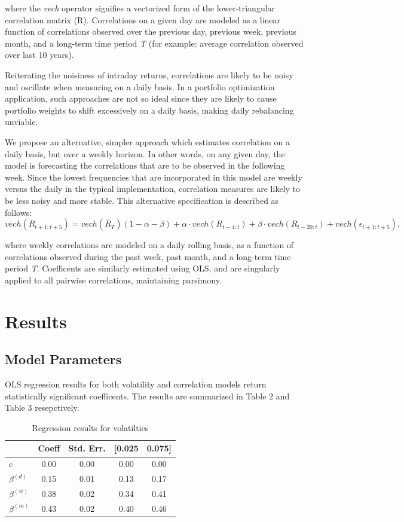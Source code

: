\documentclass{article}
\begin{document}
where the \textit{vech} operator signifies a vectorized form of the lower-triangular
correlation matrix (R). Correlations on a given day are modeled as a linear
function of correlations observed over the previous day, previous week, previous month,
and a long-term time period \textit{T} (for example: average correlation observed over last 10 years).

Reiterating the noisiness of intraday returns, correlations are likely to be noisy and 
oscillate when measuring on a daily basis. In a portfolio optimization application, such
approaches are not so ideal since they are likely to cause portfolio weights to 
shift excessively on a daily basis, making daily rebalancing unviable.

We propose an alternative, simpler approach which estimates correlation on a daily basis, but over
a weekly horizon. In other words, on any given day, the model is forecasting the correlations
that are to be observed in the following week. Since the lowest frequencies that are incorporated
in this model are weekly versus the daily in the typical implementation, correlation measures are 
likely to be less noisy and more stable. This alternative specification is described as follows:
$$vech(R_{t+1:t+5}) = vech(\bar{R}_T)(1 - \alpha - \beta) + \alpha\cdot vech(R_{t-4:t}) + \beta\cdot vech(R_{t-20:t}) + vech(\epsilon_{t+1:t+5}),$$

where weekly correlations are modeled on a daily rolling basis, as a function of correlations observed
during the past week, past month, and a long-term time period \textit{T}. Coefficents are similarly estimated using OLS,
and are singularly applied to all pairwise correlations, maintaining parsimony.

\section{Results}
\subsection{Model Parameters}

OLS regression results for both volatility and correlation models
return statistically significant coefficents. The results are summarized in
Table 2 and Table 3 resepctively.

\begin{table}[ht]
    \centering
    \caption{Regression results for volatilties}
    \begin{tabular}{lcccc}
    \toprule
    \textbf{} & \textbf{Coeff} & \textbf{Std. Err.} & \textbf{[0.025} & \textbf{0.075]} \\
    \midrule
    c & 0.00 & 0.00 & 0.00 & 0.00 \\
    $\beta^{(d)}$ & 0.15 & 0.01 & 0.13 & 0.17 \\
    $\beta^{(w)}$ & 0.38 & 0.02 & 0.34 & 0.41 \\
    $\beta^{(m)}$ & 0.43 & 0.02 & 0.40 & 0.46 \\
    \bottomrule
    \end{tabular}
\end{table}
\end{document}
